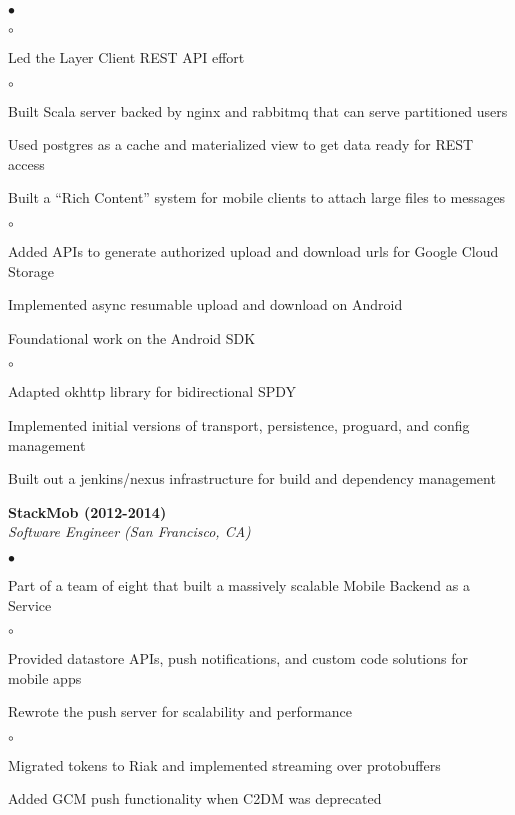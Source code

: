 \documentclass[ComputerScience]{vita}
\newenvironment{suber}[0]
{\begin{list}{$\bullet$}
	{\setlength{\topsep}{-0.4in}
		\setlength{\leftmargin}{0.25in}
		\setlength{\itemsep}{0.01in}}
}
{\end{list}\par}
\newenvironment{suberb}[0]
{\begin{list}{$\circ$}
	{\setlength{\topsep}{-0.4in}
		\setlength{\leftmargin}{0.25in}
		\setlength{\itemsep}{0.01in}}
}
{\end{list}\par}
\begin{document}
\begin{vita}
\begin{list}{}{\setlength{\leftmargin}{.25in}}
\begin{suber}
\begin{suberb}
        \end{suberb}
    \item Led the Layer Client REST API effort
        \begin{suberb}
            \item Built Scala server backed by nginx and rabbitmq that can serve partitioned users
            \item Used postgres as a cache and materialized view to get data ready for REST access
        \end{suberb}
    \item Built a ``Rich Content'' system for mobile clients to attach large files to messages
		\begin{suberb}
            \item Added APIs to generate authorized upload and download urls for Google Cloud Storage
            \item Implemented async resumable upload and download on Android
		\end{suberb}
    \item Foundational work on the Android SDK
		\begin{suberb}
			\item Adapted okhttp library for bidirectional SPDY
            \item Implemented initial versions of transport, persistence, proguard, and config management
		\end{suberb}
    \item Built out a jenkins/nexus infrastructure for build and dependency management
    \end{suber}
    \item {\bf StackMob (2012-2014)}\\
    {\em Software Engineer (San Francisco, CA)}
    \begin{suber}
	\item Part of a team of eight that built a massively scalable Mobile Backend as a Service
		\begin{suberb}
			\item Provided datastore APIs, push notifications, and custom code
			solutions for mobile apps
		\end{suberb}
	\item Rewrote the push server for scalability and performance
		\begin{suberb}
			\item Migrated tokens to Riak and implemented streaming over protobuffers
			\item Added GCM push functionality when C2DM was deprecated

\end{suberb}
\end{suber}
\end{list}
\end{vita}
\end{document}
